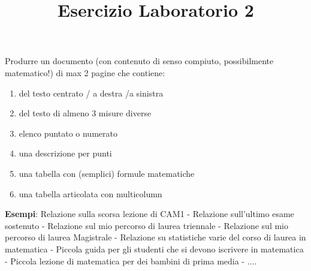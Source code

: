 \documentclass[12pt]{article}
\title{Esercizio Laboratorio 2}
\begin{document}
\maketitle

\noindent
Produrre un documento (con contenuto di senso compiuto, possibilmente matematico!) di max 2 pagine che contiene:

\begin{enumerate}
  \item del testo centrato / a destra /a sinistra
  \item del testo di almeno $3$ misure diverse
  \item elenco puntato o numerato
  \item una descrizione per punti
  \item una tabella con (semplici) formule matematiche
  \item una tabella articolata con multicolumn
  
\end{enumerate}

\noindent
\textbf{Esempi}: Relazione sulla scorsa lezione di CAM1 - Relazione sull'ultimo esame sostenuto - Relazione sul mio percorso di laurea triennale - Relazione sul mio percorso di laurea Magistrale - Relazione su statistiche varie del corso di laurea in matematica - Piccola guida per gli studenti che si devono iscrivere in matematica - Piccola lezione di matematica per dei bambini di prima media - ....
\end{document}
